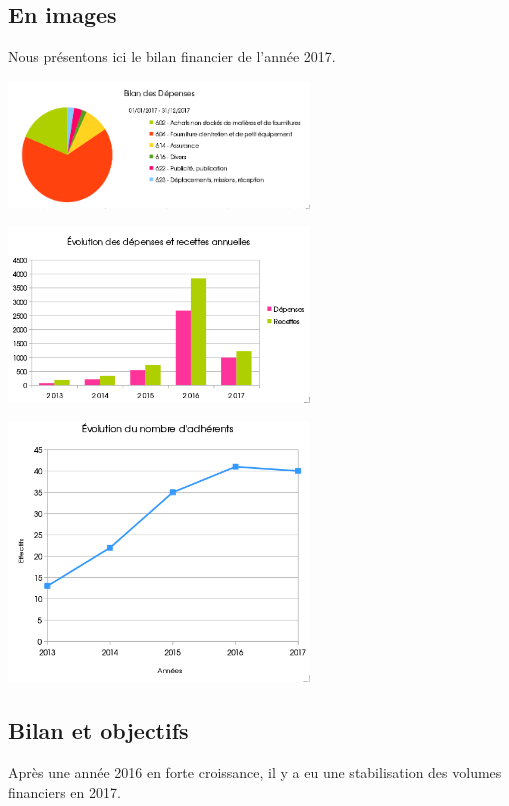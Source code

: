 \documentclass[11pt]{article}
\begin{document}
\subsection{En images}
Nous présentons ici le bilan financier de l'année 2017.
\begin{center}

\includegraphics[width=8cm]{2DossierAGDepenses2017.png}

\begin{multicols}{2}
\includegraphics[width=8cm]{3DossierAGGeneral2017.png}

\includegraphics[width=8cm]{4DossierAGAdherents2017.png}
\end{multicols}
\end{center}
\subsection{Bilan et objectifs}
Après une année 2016 en forte croissance, il y a eu une stabilisation des volumes
financiers en 2017.
\end{document}

